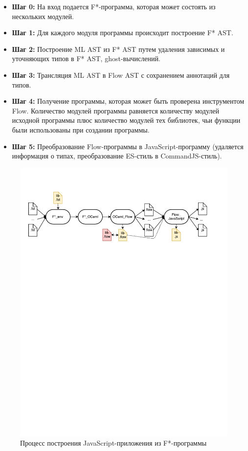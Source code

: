 \begin{itemize}
\item \textbf{Шаг 0:} На вход подается F*-программа, которая может состоять из нескольких модулей. 
\item \textbf{Шаг 1:} Для каждого модуля программы происходит построение F* AST.
\item \textbf{Шаг 2:} Построение ML AST из F* AST путем удаления зависимых и уточняющих типов в F* AST, ghost-вычислений.
\item \textbf{Шаг 3:} Трансляция ML AST в Flow AST с сохранением аннотаций для типов.
\item \textbf{Шаг 4:} Получение программы, которая может быть проверена инструментом Flow. Количество модулей программы равняется количеству модулей исходной программы плюс количество модулей тех библиотек, чьи функции были использованы при создании программы. 
\item \textbf{Шаг 5:} Преобразование Flow-программы в JavaScript-программу (удаляется информация о типах, преобразование ES-стиль в CommandJS-стиль).
\end{itemize}

\begin{figure}[h!]
\begin{center}
\includegraphics[width=\textwidth]{Polubelova/Workflow}
\caption{Процесс построения JavaScript-приложения из F*-программы}
\label{fig:modules} 
\end{center}
\end{figure}

